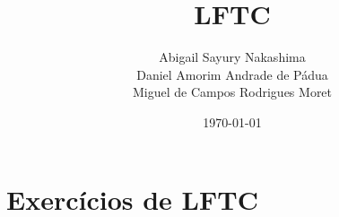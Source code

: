 \documentclass[a4paper, 12pt]{article}
\title{LFTC}
\author{Abigail Sayury Nakashima \\ Daniel Amorim Andrade de Pádua \\ Miguel de Campos Rodrigues Moret}
\date{\today}
\begin{document}
\maketitle
\newpage

\section{Exercícios de LFTC}








\end{document}
